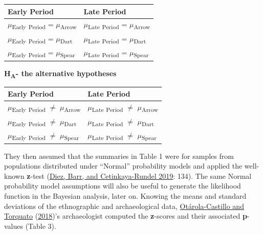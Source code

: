 \documentclass[
]{article}
\begin{document}
\begin{longtable}[]{@{}ll@{}}
\toprule
Early Period & Late Period \\
\midrule
\endhead
\(\mu\)\textsubscript{Early} \textsubscript{Period} =
\(\mu\)\textsubscript{Arrow} & \(\mu\)\textsubscript{Late}
\textsubscript{Period} = \(\mu\)\textsubscript{Arrow} \\
\(\mu\)\textsubscript{Early} \textsubscript{Period} =
\(\mu\)\textsubscript{Dart} & \(\mu\)\textsubscript{Late}
\textsubscript{Period} = \(\mu\)\textsubscript{Dart} \\
\(\mu\)\textsubscript{Early} \textsubscript{Period} =
\(\mu\)\textsubscript{Spear} & \(\mu\)\textsubscript{Late}
\textsubscript{Period} = \(\mu\)\textsubscript{Spear} \\
\bottomrule
\end{longtable}

\textbf{H\textsubscript{A}- the alternative hypotheses}

\begin{longtable}[]{@{}ll@{}}
\toprule
Early Period & Late Period \\
\midrule
\endhead
\(\mu\)\textsubscript{Early} \textsubscript{Period} \(\not=\)
\(\mu\)\textsubscript{Arrow} & \(\mu\)\textsubscript{Late}
\textsubscript{Period} \(\not=\) \(\mu\)\textsubscript{Arrow} \\
\(\mu\)\textsubscript{Early} \textsubscript{Period} \(\not=\)
\(\mu\)\textsubscript{Dart} & \(\mu\)\textsubscript{Late}
\textsubscript{Period} \(\not=\) \(\mu\)\textsubscript{Dart} \\
\(\mu\)\textsubscript{Early} \textsubscript{Period} \(\not=\)
\(\mu\)\textsubscript{Spear} & \(\mu\)\textsubscript{Late}
\textsubscript{Period} \(\not=\) \(\mu\)\textsubscript{Spear} \\
\bottomrule
\end{longtable}

They then assumed that the summaries in Table 1 were for samples from
populations distributed under ``Normal'' probability models and applied
the well-known \textbf{z}-test
(\protect\hyperlink{ref-diez_open_2019}{Diez, Barr, and Cetinkaya-Rundel
2019}: 134). The same Normal probability model assumptions will also be
useful to generate the likelihood function in the Bayesian analysis,
later on. Knowing the means and standard deviations of the ethnographic
and archaeological data,
\protect\hyperlink{ref-otarola-castillo_bayesian_2018}{Otárola-Castillo
and Torquato}
(\protect\hyperlink{ref-otarola-castillo_bayesian_2018}{2018})'s
archaeologist computed the \textbf{z}-scores and their associated
\textbf{p}-values (Table 3).
\end{document}
